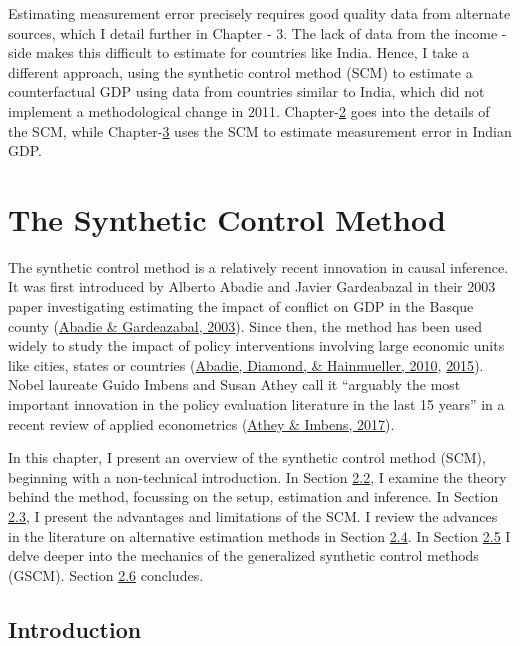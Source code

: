 \documentclass[12pt,nobind, a4paper]{reedthesis}
\begin{document}
 Estimating measurement error precisely requires good quality data from alternate sources, which I detail further in Chapter - 3. The lack of data from the income - side makes this difficult to estimate for countries like India. Hence, I take a different approach, using the synthetic control method (SCM) to estimate a counterfactual GDP using data from countries similar to India, which did not implement a methodological change in 2011. Chapter-\protect\hyperlink{ch2}{2} goes into the details of the SCM, while Chapter-\protect\hyperlink{ch3}{3} uses the SCM to estimate measurement error in Indian GDP.

 \hypertarget{ch2}{%
 \chapter{The Synthetic Control Method}\label{ch2}}

 The synthetic control method is a relatively recent innovation in causal inference. It was first introduced by Alberto Abadie and Javier Gardeabazal in their 2003 paper investigating estimating the impact of conflict on GDP in the Basque county (\protect\hyperlink{ref-abadie_economic_2003}{Abadie \& Gardeazabal, 2003}). Since then, the method has been used widely to study the impact of policy interventions involving large economic units like cities, states or countries (\protect\hyperlink{ref-abadie_synthetic_2010}{Abadie, Diamond, \& Hainmueller, 2010}, \protect\hyperlink{ref-abadie_comparative_2015}{2015}). Nobel laureate Guido Imbens and Susan Athey call it ``arguably the most important innovation in the policy evaluation literature in the last 15 years'' in a recent review of applied econometrics (\protect\hyperlink{ref-athey_state_2017}{Athey \& Imbens, 2017}).
 \linebreak

 In this chapter, I present an overview of the synthetic control method (SCM), beginning with a non-technical introduction. In Section \protect\hyperlink{fmr}{2.2}, I examine the theory behind the method, focussing on the setup, estimation and inference. In Section \protect\hyperlink{advdisadv}{2.3}, I present the advantages and limitations of the SCM. I review the advances in the literature on alternative estimation methods in Section \protect\hyperlink{alt}{2.4}. In Section \protect\hyperlink{gscm}{2.5} I delve deeper into the mechanics of the generalized synthetic control methods (GSCM). Section \protect\hyperlink{conc}{2.6} concludes.

 \hypertarget{introduction}{%
 \section{Introduction}\label{introduction}}
\end{document}
